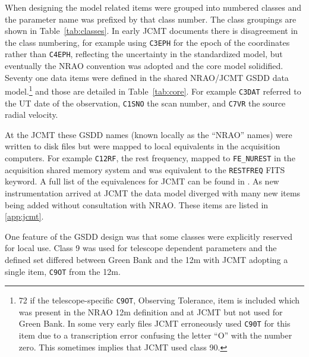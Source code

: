 \documentclass[final,authoryear,5p,times,twocolumn]{elsarticle}
\begin{document}
When designing the model related items were grouped into numbered
classes and the parameter name was prefixed by that class number. The
class groupings are shown in Table~\ref{tab:classes}. In early JCMT
documents \citep[e.g.][]{mtdn84} there is disagreement in the class
numbering, for example using \texttt{C3EPH} for the epoch of the
coordinates rather than \texttt{C4EPH}, reflecting the uncertainty in
the standardized model, but eventually \citep[see e.g.][]{mtdn85}
the NRAO convention was adopted and the core model solidified.
Seventy one data items were defined in the shared NRAO/JCMT GSDD data
model.\footnote{72 if the telescope-specific \texttt{C9OT}, Observing
  Tolerance, item is included which was present in the NRAO 12m
  definition and at JCMT but not used for Green Bank. In some very
  early files JCMT erroneously used \texttt{C90T} for this item due to
  a transcription error confusing the letter ``O'' with the number
  zero. This sometimes implies that JCMT used class 90.} and those are
detailed in Table~\ref{tab:core}. For example \texttt{C3DAT} referred
to the UT date of the observation, \texttt{C1SNO} the scan number,
and \texttt{C7VR} the source radial velocity.

At the JCMT these GSDD names (known locally as the ``NRAO'' names)
were written to disk files but were mapped to local equivalents in
the acquisition computers. For example \texttt{C12RF}, the rest
frequency, mapped to \texttt{FE\_NUREST} in the acquisition shared
memory system and
was equivalent to the \texttt{RESTFREQ} FITS keyword. A full list of
the equivalences for JCMT can be found in \citet{SUN229}. As new
instrumentation arrived at JCMT the data model diverged with many new
items being added without consultation with NRAO. These items are
listed in \ref{app:jcmt}.

One feature of the GSDD design was that some classes were
explicitly reserved for local use. Class 9 was used for telescope
dependent parameters and the defined set differed between Green Bank
and the 12m with JCMT adopting a single item, \texttt{C9OT} from the
12m.
\end{document}
